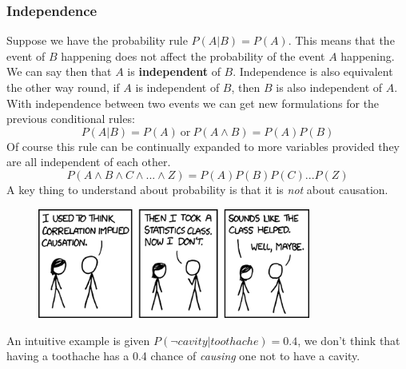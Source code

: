 \documentclass{article}
\newcommand{\n}[0]{\\[\baselineskip]}
\begin{document}
\subsubsection{Independence}
Suppose we have the probability rule $P(A|B) = P(A)$. This means that the event of $B$ happening does not affect the probability of the event $A$ happening. We can say then that $A$ is \textbf{independent} of $B$. Independence is also equivalent the other way round, if $A$ is independent of $B$, then $B$ is also independent of $A$.
\n
With independence between two events we can get new formulations for the previous conditional rules:
\begin{equation}
P(A|B) = P(A)\ \text{or}\ P(A \wedge B) = P(A)P(B)
\end{equation}
Of course this rule can be continually expanded to more variables provided they are all independent of each other. 
\begin{equation}
P(A \wedge B \wedge C \wedge ... \wedge Z) = P(A)P(B)P(C)...P(Z)
\end{equation}
A key thing to understand about probability is that it is \textit{not} about causation.
\begin{figure}[H]
\centering
\includegraphics[width=0.8\textwidth, keepaspectratio]{imgs/correlation.png}
\end{figure}
\noindent
An intuitive example is given $P(\neg cavity|toothache) = 0.4$, we don't think that having a toothache has a 0.4 chance of \textit{causing} one not to have a cavity. 
\end{document}
